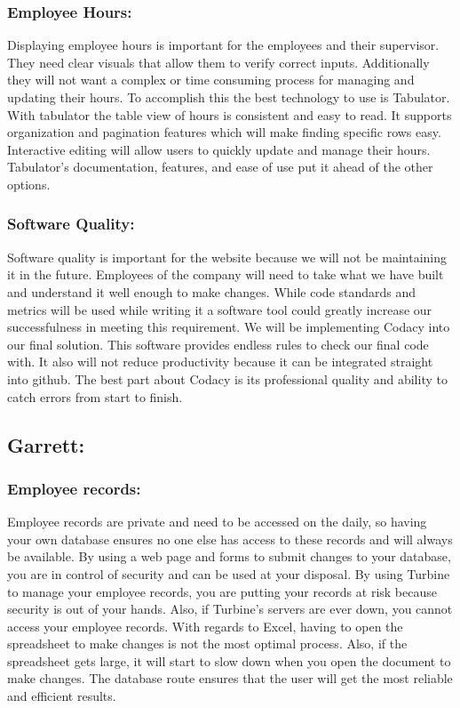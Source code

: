 \documentclass[letterpaper,10pt,titlepage,journal,compsoc,draftclsnofoot,onecolumn]{IEEEtran}
\newcommand\tab[1][1cm]{\hspace*{#1}}
\begin{document}
\subsubsection{Employee Hours:}
\tab Displaying employee hours is important for the employees and their supervisor. They need clear visuals that allow them to verify correct inputs. Additionally they will not want a complex or time consuming process for managing and updating their hours. To accomplish this the best technology to use is Tabulator. With tabulator the table view of hours is consistent and easy to read. It supports organization and pagination features which will make finding specific rows easy. Interactive editing will allow users to quickly update and manage their hours. Tabulator’s documentation, features, and ease of use put it ahead of the other options. \newline

\subsubsection{Software Quality:}
\tab Software quality is important for the website because we will not be maintaining it in the future. Employees of the company will need to take what we have built and understand it well enough to make changes. While code standards and metrics will be used while writing it a software tool could greatly increase our successfulness in meeting this requirement. We will be implementing Codacy into our final solution. This software provides endless rules to check our final code with. It also will not reduce productivity because it can be integrated straight into github. The best part about Codacy is its professional quality and ability to catch errors from start to finish. \newline

\subsection{Garrett:}
\subsubsection{Employee records:}
\tab Employee records are private and need to be accessed on the daily, so having your own database ensures no one else has access to these records and will always be available. By using a web page and forms to submit changes to your database, you are in control of security and can be used at your disposal. By using Turbine to manage your employee records, you are putting your records at risk because security is out of your hands. Also, if Turbine’s servers are ever down, you cannot access your employee records. With regards to Excel, having to open the spreadsheet to make changes is not the most optimal process. Also, if the spreadsheet gets large, it will start to slow down when you open the document to make changes. The database route ensures that the user will get the most reliable and efficient results.  \newline 
\end{document}
